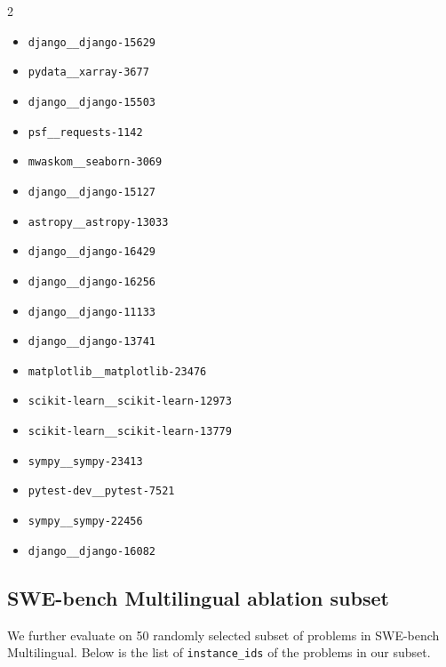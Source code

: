 \documentclass{article}
\newcommand{\swebenchmultilingual}{SWE-bench Multilingual\xspace}
\newcommand{\CodeIn}[1]{{\small \texttt{#1}}}
\begin{document}
\begin{multicols}{2}
\begin{itemize}
\item \texttt{django\_\_django-15629}
\item \texttt{pydata\_\_xarray-3677}
\item \texttt{django\_\_django-15503}
\item \texttt{psf\_\_requests-1142}
\item \texttt{mwaskom\_\_seaborn-3069}
\item \texttt{django\_\_django-15127}
\item \texttt{astropy\_\_astropy-13033}
\item \texttt{django\_\_django-16429}
\item \texttt{django\_\_django-16256}
\item \texttt{django\_\_django-11133}
\item \texttt{django\_\_django-13741}
\item \texttt{matplotlib\_\_matplotlib-23476}
\item \texttt{scikit-learn\_\_scikit-learn-12973}
\item \texttt{scikit-learn\_\_scikit-learn-13779}
\item \texttt{sympy\_\_sympy-23413}
\item \texttt{pytest-dev\_\_pytest-7521}
\item \texttt{sympy\_\_sympy-22456}
\item \texttt{django\_\_django-16082}
\end{itemize}
\end{multicols}


\subsection{\swebenchmultilingual ablation subset}
\label{appendix:multilingal_subset}

We further evaluate on 50 randomly selected subset of problems in \swebenchmultilingual. 
Below is the list of \CodeIn{instance\_ids} of the problems in our subset.
\end{document}
